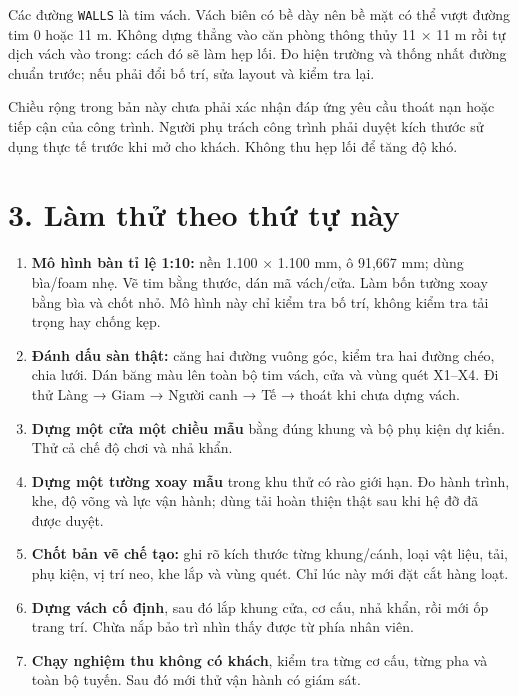 \documentclass[
  11pt,
  a4paper,
]{article}
\providecommand{\tightlist}{%
  \setlength{\itemsep}{0pt}\setlength{\parskip}{0pt}}
\begin{document}
Các đường \texttt{WALLS} là tim vách. Vách biên có bề dày nên bề mặt có
thể vượt đường tim 0 hoặc 11 m. Không dựng thẳng vào căn phòng thông
thủy 11 × 11 m rồi tự dịch vách vào trong: cách đó sẽ làm hẹp lối. Đo
hiện trường và thống nhất đường chuẩn trước; nếu phải đổi bố trí, sửa
layout và kiểm tra lại.

Chiều rộng trong bản này chưa phải xác nhận đáp ứng yêu cầu thoát nạn
hoặc tiếp cận của công trình. Người phụ trách công trình phải duyệt kích
thước sử dụng thực tế trước khi mở cho khách. Không thu hẹp lối để tăng
độ khó.

\section{3. Làm thử theo thứ tự
này}\label{luxe0m-thux1eed-theo-thux1ee9-tux1ef1-nuxe0y}

\begin{enumerate}
\def\labelenumi{\arabic{enumi}.}
\tightlist
\item
  \textbf{Mô hình bàn tỉ lệ 1:10:} nền 1.100 × 1.100 mm, ô 91,667 mm;
  dùng bìa/foam nhẹ. Vẽ tim bằng thước, dán mã vách/cửa. Làm bốn tường
  xoay bằng bìa và chốt nhỏ. Mô hình này chỉ kiểm tra bố trí, không kiểm
  tra tải trọng hay chống kẹp.
\item
  \textbf{Đánh dấu sàn thật:} căng hai đường vuông góc, kiểm tra hai
  đường chéo, chia lưới. Dán băng màu lên toàn bộ tim vách, cửa và vùng
  quét X1--X4. Đi thử Làng → Giam → Người canh → Tế → thoát khi chưa
  dựng vách.
\item
  \textbf{Dựng một cửa một chiều mẫu} bằng đúng khung và bộ phụ kiện dự
  kiến. Thử cả chế độ chơi và nhả khẩn.
\item
  \textbf{Dựng một tường xoay mẫu} trong khu thử có rào giới hạn. Đo
  hành trình, khe, độ võng và lực vận hành; dùng tải hoàn thiện thật sau
  khi hệ đỡ đã được duyệt.
\item
  \textbf{Chốt bản vẽ chế tạo:} ghi rõ kích thước từng khung/cánh, loại
  vật liệu, tải, phụ kiện, vị trí neo, khe lắp và vùng quét. Chỉ lúc này
  mới đặt cắt hàng loạt.
\item
  \textbf{Dựng vách cố định}, sau đó lắp khung cửa, cơ cấu, nhả khẩn,
  rồi mới ốp trang trí. Chừa nắp bảo trì nhìn thấy được từ phía nhân
  viên.
\item
  \textbf{Chạy nghiệm thu không có khách}, kiểm tra từng cơ cấu, từng
  pha và toàn bộ tuyến. Sau đó mới thử vận hành có giám sát.
\end{enumerate}
\end{document}
